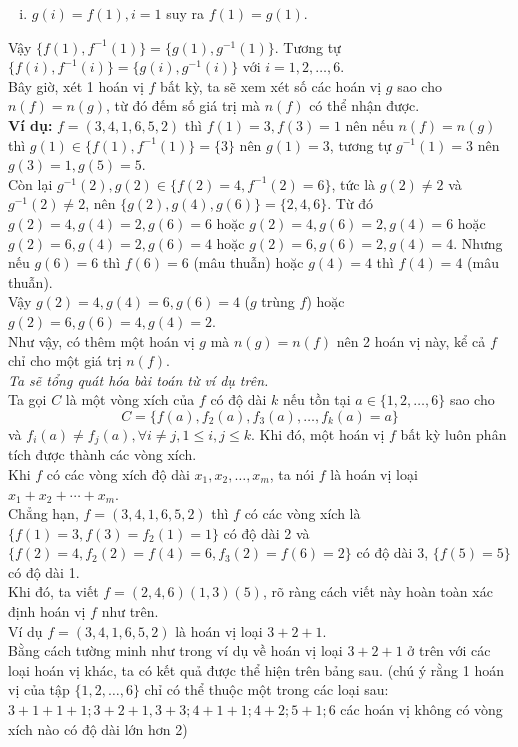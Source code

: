 \begin{bt}
{\begin{enumerate}[i)]
			\item $g(i)=f(1),i=1$ suy ra $f(1)=g(1)$.
		\end{enumerate}
		Vậy $\{f(1),f^{-1}(1)\}=\{g(1),g^{-1}(1)\}$. Tương tự $\{f(i),f^{-1}(i)\}=\{g(i),g^{-1}(i)\}$ với $i=1,2,\hdots,6$.\\
		Bây giờ, xét 1 hoán vị $f$ bất kỳ, ta sẽ xem xét số các hoán vị $g$ sao cho $n(f)=n(g)$, từ đó đếm số giá trị mà $n(f)$ có thể nhận được.\\
		\textbf{Ví dụ:} $f=(3,4,1,6,5,2)$ thì $f(1)=3,f(3)=1$ nên nếu $n(f)=n(g)$ thì $ g(1) \in \{f(1),f^{-1}(1) \} = \{3\}$ nên $g(1)=3$, tương tự $g^{-1}(1)=3$ nên $g(3)=1,g(5)=5$.\\
		Còn lại $g^{-1}(2),g(2)\in\{f(2)=4,f^{-1}(2)=6\}$, tức là $g(2)\neq 2$ và $g^{-1}(2)\neq 2$, nên $\{g(2),g(4),g(6)\} = \{2,4,6\}$. Từ đó $g(2)=4,g(4)=2,g(6)=6$ hoặc $g(2)=4,g(6)=2,g(4)=6$ hoặc $g(2)=6,g(4)=2,g(6)=4$ hoặc $g(2)=6,g(6)=2,g(4)=4$. Nhưng nếu $g(6)=6$ thì $f(6)=6$ (mâu thuẫn) hoặc $g(4)=4$ thì $f(4)=4$ (mâu thuẫn).\\
		Vậy $g(2)=4,g(4)=6, g(6)=4$ ($g$ trùng $f$) hoặc $g(2)=6,g(6)=4,g(4)=2$.\\
		Như vậy, có thêm một hoán vị $g$ mà $n(g)=n(f)$ nên 2 hoán vị này, kể cả $f$ chỉ cho một giá trị $n(f)$.\\
		\textit{Ta sẽ tổng quát hóa bài toán từ ví dụ trên.}\\
		Ta gọi $C$ là một vòng xích của $f$ có độ dài $k$ nếu tồn tại $a\in \{1,2,\hdots,6\}$ sao cho $$C=\{f(a),f_2(a),f_3(a),\hdots,f_k(a)=a\}$$ và $f_i(a)\neq f_j(a),\forall i\neq j,1\leq i,j\leq k$.
		Khi đó, một hoán vị $f$ bất kỳ luôn phân tích được thành các vòng xích.\\
		Khi $f$ có các vòng xích độ dài $x_1,x_2,\hdots,x_m$, ta nói $f$ là hoán vị loại $x_1+x_2+\cdots+x_m$.\\
		Chẳng hạn, $f=(3,4,1,6,5,2)$ thì $f$ có các vòng xích là $\{f(1)=3,f(3)=f_2(1)=1\}$ có độ dài 2 và $\{ f(2)=4,f_2(2)=f(4)=6,f_3(2)=f(6)=2 \}$ có độ dài 3, $\{f(5)=5\}$ có độ dài 1.\\
		Khi đó, ta viết $f=(2,4,6)(1,3)(5)$, rõ ràng cách viết này hoàn toàn xác định hoán vị $f$ như trên.\\
		Ví dụ $f=(3,4,1,6,5,2)$ là hoán vị loại $3+2+1$.\\
		Bằng cách tường minh như trong ví dụ về hoán vị loại $3+2+1$ ở trên với các loại hoán vị khác, ta có kết quả được thể hiện trên bảng sau. (chú ý rằng 1 hoán vị của tập $\{1,2,\hdots,6\}$ chỉ có thể thuộc một trong các loại sau: $3+1+1+1; 3+2+1,3+3; 4+1+1; 4+2; 5+1; 6$ các hoán vị không có vòng xích nào có độ dài lớn hơn 2)
		
}
\end{bt}
